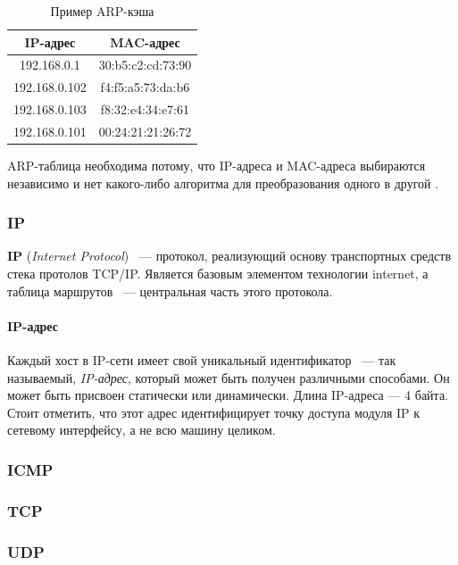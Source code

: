 \begin{table}[H]
\caption{Пример ARP-кэша}
\label{arpcache}
	\begin{tabular}{|c|c|}
	\hline
	IP-адрес & MAC-адрес\\
	\hline
	192.168.0.1 & 30:b5:c2:cd:73:90 \\
	\hline
	192.168.0.102 & f4:f5:a5:73:da:b6 \\
	\hline
	192.168.0.103 & f8:32:e4:34:e7:61 \\
	\hline
	192.168.0.101 & 00:24:21:21:26:72 \\
	\hline
	\end{tabular}
\end{table}

ARP-таблица необходима потому, что IP-адреса и MAC-адреса выбираются независимо и нет какого-либо алгоритма для преобразования одного в другой \cite{arpcitforum}.

\subsubsection{IP}

\textbf{IP} (\textit{Internet Protocol}) ~--- протокол, реализующий основу транспортных средств стека протолов TCP/IP. Является базовым элементом технологии internet, а таблица маршрутов ~--- центральная часть этого      протокола.

\paragraph{IP-адрес}

Каждый хост в IP-сети имеет свой уникальный идентификатор ~--- так называемый, \textit{IP-адрес}, который может быть получен различными способами. Он может быть присвоен статически или динамически. Длина IP-адреса --- 4 байта. Стоит отметить, что этот адрес идентифицирует точку доступа модуля IP к сетевому интерфейсу, а не всю машину целиком.

\subsubsection{ICMP}
\subsubsection{TCP}
\subsubsection{UDP}


